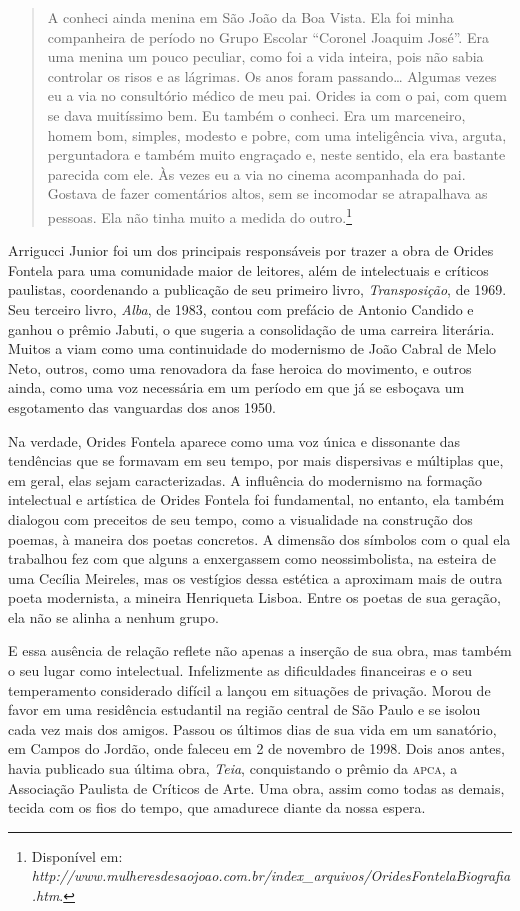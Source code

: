 \begin{quote}
A conheci ainda menina em São João da Boa Vista. Ela foi minha companheira de período no Grupo Escolar ``Coronel Joaquim José''. Era uma menina um pouco peculiar, como foi a vida inteira, pois não sabia controlar os risos e as lágrimas. Os anos foram passando\ldots{} Algumas vezes eu a via no consultório médico de meu pai. Orides ia com o pai, com quem se dava muitíssimo bem. Eu também o conheci. Era um marceneiro, homem bom, simples, modesto e pobre, com uma inteligência viva, arguta, perguntadora e também muito engraçado e, neste sentido, ela era bastante parecida com ele. Às vezes eu a via no cinema acompanhada do pai. Gostava de fazer comentários altos, sem se incomodar se atrapalhava as pessoas. Ela não tinha muito a medida do outro.\footnote{Disponível em: \emph{http://www.mulheresdesaojoao.com.br/index\_arquivos/OridesFontelaBiografia.htm}.}
\end{quote}


Arrigucci Junior foi um dos
principais responsáveis por trazer a obra de Orides Fontela para uma
comunidade maior de leitores, além de intelectuais e críticos paulistas,
coordenando a publicação de seu primeiro livro, \emph{Transposição}, de
1969. Seu terceiro livro, \emph{Alba}, de 1983, contou com prefácio de
Antonio Candido e ganhou o prêmio Jabuti, o que sugeria a consolidação
de uma carreira literária. Muitos a viam como uma continuidade do
modernismo de João Cabral de Melo Neto, outros, como uma renovadora da
fase heroica do movimento, e outros ainda, como uma voz necessária em um
período em que já se esboçava um esgotamento das vanguardas dos anos
1950.

Na verdade, Orides Fontela aparece como uma voz única e dissonante das
tendências que se formavam em seu tempo, por mais dispersivas e
múltiplas que, em geral, elas sejam caracterizadas. A influência do
modernismo na formação intelectual e artística de Orides Fontela foi
fundamental, no entanto, ela também dialogou com preceitos de seu tempo,
como a visualidade na construção dos poemas, à maneira dos poetas
concretos. A dimensão dos símbolos com o qual ela trabalhou fez com que
alguns a enxergassem como neossimbolista, na esteira de uma Cecília
Meireles, mas os vestígios dessa estética a aproximam mais de outra
poeta modernista, a mineira Henriqueta Lisboa. Entre os poetas de sua
geração, ela não se alinha a nenhum grupo.

E essa ausência de relação reflete não apenas a inserção de sua obra,
mas também o seu lugar como intelectual. Infelizmente as dificuldades
financeiras e o seu temperamento considerado difícil a lançou em
situações de privação. Morou de favor em uma residência estudantil na
região central de São Paulo e se isolou cada vez mais dos amigos. Passou
os últimos dias de sua vida em um sanatório, em Campos do Jordão, onde
faleceu em 2 de novembro de 1998. Dois anos antes, havia publicado sua
última obra, \emph{Teia}, conquistando o prêmio da \textsc{apca}, a Associação
Paulista de Críticos de Arte. Uma obra, assim como todas as demais,
tecida com os fios do tempo, que amadurece diante da nossa espera.

